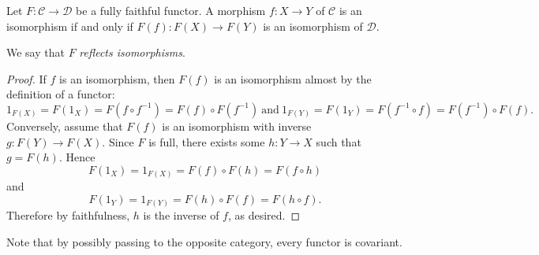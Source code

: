 \documentclass[10pt]{amsart}
\begin{document}
\begin{prop}\label{p.2}
  Let $F \colon \mathscr{C} \rightarrow \mathscr{D}$ be a fully faithful functor.
  A morphism $f \colon X \rightarrow Y$ of $\mathscr{C}$ is an isomorphism if and only if $F(f) \colon F(X) \rightarrow F(Y)$ is an isomorphism of $\mathscr{D}$.

  We say that $F$ {\em reflects isomorphisms}.

  \begin{proof}
    If $f$ is an isomorphism, then $F(f)$ is an isomorphism almost by the definition of a functor: 
    $$1_{F(X)} = F(1_X) = F(f \circ f^{-1}) = F(f) \circ F(f^{-1}) \ \text{and}\ 1_{F(Y)} = F(1_Y) = F(f^{-1} \circ f) = F(f^{-1}) \circ F(f).$$
    Conversely, assume that $F(f)$ is an isomorphism with inverse $g : F(Y) \rightarrow F(X)$.
    Since $F$ is full, there exists some $h : Y \rightarrow X$ such that $g = F(h)$.
    Hence
    $$F(1_X) = 1_{F(X)} = F(f) \circ F(h) = F(f \circ h)$$
    and
    $$F(1_Y) = 1_{F(Y)} = F(h) \circ F(f)= F(h \circ f).$$
    Therefore by faithfulness, $h$ is the inverse of $f$, as desired.
  \end{proof}
\end{prop}
\begin{rmk}
  Note that by possibly passing to the opposite category, every functor is covariant.
\end{rmk}
\end{document}
